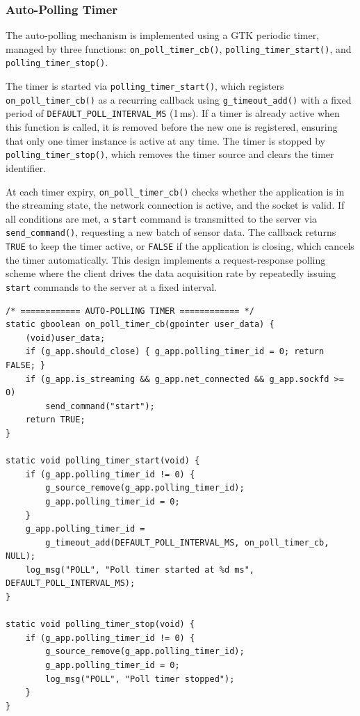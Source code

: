 \subsubsection{Auto-Polling Timer}

The auto-polling mechanism is implemented using a GTK periodic timer,
managed by three functions: \texttt{on\_poll\_timer\_cb()},
\texttt{polling\_timer\_start()}, and \texttt{polling\_timer\_stop()}.

The timer is started via \texttt{polling\_timer\_start()}, which
registers \texttt{on\_poll\_timer\_cb()} as a recurring callback using
\texttt{g\_timeout\_add()} with a fixed period of
\texttt{DEFAULT\_POLL\_INTERVAL\_MS} (1\,ms). If a timer is already
active when this function is called, it is removed before the new one is
registered, ensuring that only one timer instance is active at any time.
The timer is stopped by \texttt{polling\_timer\_stop()}, which removes
the timer source and clears the timer identifier.

At each timer expiry, \texttt{on\_poll\_timer\_cb()} checks whether the
application is in the streaming state, the network connection is active,
and the socket is valid. If all conditions are met, a \texttt{start}
command is transmitted to the server via \texttt{send\_command()},
requesting a new batch of sensor data. The callback returns \texttt{TRUE}
to keep the timer active, or \texttt{FALSE} if the application is closing,
which cancels the timer automatically. This design implements a
request-response polling scheme where the client drives the data
acquisition rate by repeatedly issuing \texttt{start} commands to the
server at a fixed interval.

\begin{verbatim}
/* ============ AUTO-POLLING TIMER ============ */
static gboolean on_poll_timer_cb(gpointer user_data) {
    (void)user_data;
    if (g_app.should_close) { g_app.polling_timer_id = 0; return FALSE; }
    if (g_app.is_streaming && g_app.net_connected && g_app.sockfd >= 0)
        send_command("start");
    return TRUE;
}

static void polling_timer_start(void) {
    if (g_app.polling_timer_id != 0) {
        g_source_remove(g_app.polling_timer_id);
        g_app.polling_timer_id = 0;
    }
    g_app.polling_timer_id =
        g_timeout_add(DEFAULT_POLL_INTERVAL_MS, on_poll_timer_cb, NULL);
    log_msg("POLL", "Poll timer started at %d ms", DEFAULT_POLL_INTERVAL_MS);
}

static void polling_timer_stop(void) {
    if (g_app.polling_timer_id != 0) {
        g_source_remove(g_app.polling_timer_id);
        g_app.polling_timer_id = 0;
        log_msg("POLL", "Poll timer stopped");
    }
}
\end{verbatim}


